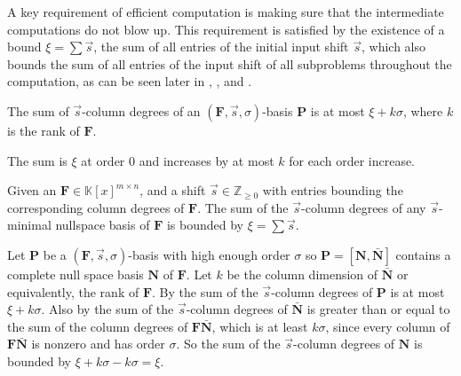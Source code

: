 A key requirement of efficient computation is making sure that the
intermediate computations do not blow up. This requirement is satisfied
by the existence of a bound $\xi=\sum\vec{s}$, the sum of all entries
of the initial input shift $\vec{s}$, which also bounds the sum of
all entries of the input shift of all subproblems throughout the computation,
as can be seen later in ,
, and .
\begin{lem}
\label{lem:boundOfSumOfShiftedDegreesOfOrderBasis}The sum of $\vec{s}$-column
degrees of an $(\mathbf{F},\vec{s},\sigma)$-basis $\mathbf{P}$ is
at most $\xi+k\sigma$, where $k$ is the rank of $\mathbf{F}$.\end{lem}
\begin{pf}
The sum is $\xi$ at order 0 and increases by at most $k$ for each
order increase.\end{pf}
\begin{lem}
\label{lem:boundOfSumOfShiftedDegreesOfNullspaceBasis}Given an $\mathbf{F}\in\mathbb{K}\left[x\right]^{m\times n}$,
and a shift $\vec{s}\in\mathbb{Z}_{\ge0}$ with entries bounding the
corresponding column degrees of $\mathbf{F}$. The sum of the $\vec{s}$-column
degrees of any $\vec{s}$-minimal nullspace basis of $\mathbf{F}$
is bounded by $\xi=\sum\vec{s}$.\end{lem}
\begin{pf}
Let $\mathbf{P}$ be a $(\mathbf{F},\vec{s},\sigma)$-basis with high
enough order $\sigma$ so $\mathbf{P}=\left[\mathbf{N},\bar{\mathbf{N}}\right]$
contains a complete null space basis $\mathbf{N}$ of $\mathbf{F}$.
Let $k$ be the column dimension of $\bar{\mathbf{N}}$ or equivalently,
the rank of $\mathbf{F}$. By 
the sum of the $\vec{s}$-column degrees of $\mathbf{P}$ is at most
$\xi+k\sigma$. Also by  the sum
of the $\vec{s}$-column degrees of $\bar{\mathbf{N}}$ is greater
than or equal to the sum of the column degrees of $\mathbf{F}\bar{\mathbf{N}}$,
which is at least $k\sigma$, since every column of $\mathbf{F}\bar{\mathbf{N}}$
is nonzero and has order $\sigma$. So the sum of the $\vec{s}$-column
degrees of $\mathbf{N}$ is bounded by $\xi+k\sigma-k\sigma=\xi$.
\end{pf}
\begin{comment}
This allows the initial bound on the shift to propagate on both the
intermediate results $\mathbf{A}$ and the residual $\mathbf{FA}$
to propagate throughout the computation, hence the complexity 
\end{comment}


